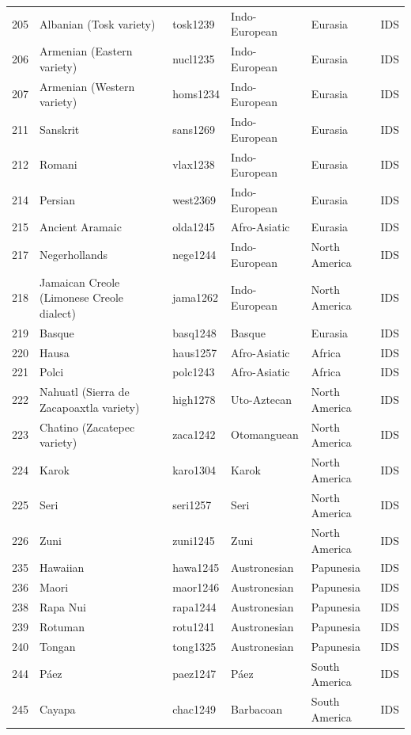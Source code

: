 \begin{table}[ht]
\begin{tabular}{rlllll}
  205 & Albanian (Tosk variety) & tosk1239 & Indo-European & Eurasia & IDS \\ 
  206 & Armenian (Eastern variety) & nucl1235 & Indo-European & Eurasia & IDS \\ 
  207 & Armenian (Western variety) & homs1234 & Indo-European & Eurasia & IDS \\ 
  211 & Sanskrit & sans1269 & Indo-European & Eurasia & IDS \\ 
  212 & Romani & vlax1238 & Indo-European & Eurasia & IDS \\ 
  214 & Persian & west2369 & Indo-European & Eurasia & IDS \\ 
  215 & Ancient Aramaic & olda1245 & Afro-Asiatic & Eurasia & IDS \\ 
  217 & Negerhollands & nege1244 & Indo-European & North America & IDS \\ 
  218 & Jamaican Creole (Limonese Creole dialect) & jama1262 & Indo-European & North America & IDS \\ 
  219 & Basque & basq1248 & Basque & Eurasia & IDS \\ 
  220 & Hausa & haus1257 & Afro-Asiatic & Africa & IDS \\ 
  221 & Polci & polc1243 & Afro-Asiatic & Africa & IDS \\ 
  222 & Nahuatl (Sierra de Zacapoaxtla variety) & high1278 & Uto-Aztecan & North America & IDS \\ 
  223 & Chatino (Zacatepec variety) & zaca1242 & Otomanguean & North America & IDS \\ 
  224 & Karok & karo1304 & Karok & North America & IDS \\ 
  225 & Seri & seri1257 & Seri & North America & IDS \\ 
  226 & Zuni & zuni1245 & Zuni & North America & IDS \\ 
  235 & Hawaiian & hawa1245 & Austronesian & Papunesia & IDS \\ 
  236 & Maori & maor1246 & Austronesian & Papunesia & IDS \\ 
  238 & Rapa Nui & rapa1244 & Austronesian & Papunesia & IDS \\ 
  239 & Rotuman & rotu1241 & Austronesian & Papunesia & IDS \\ 
  240 & Tongan & tong1325 & Austronesian & Papunesia & IDS \\ 
  244 & Páez & paez1247 & Páez & South America & IDS \\ 
  245 & Cayapa & chac1249 & Barbacoan & South America & IDS \\ 

\end{tabular}
\end{table}

